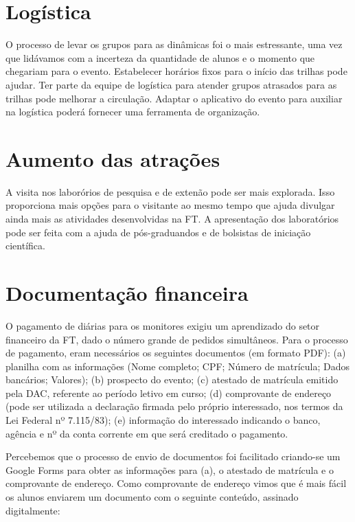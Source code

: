 \documentclass[
  letterpaper,
  DIV=11,
  numbers=noendperiod]{scrreprt}
\begin{document}
\section{Logística}\label{loguxedstica}

O processo de levar os grupos para as dinâmicas foi o mais estressante,
uma vez que lidávamos com a incerteza da quantidade de alunos e o
momento que chegariam para o evento. Estabelecer horários fixos para o
início das trilhas pode ajudar. Ter parte da equipe de logística para
atender grupos atrasados para as trilhas pode melhorar a circulação.
Adaptar o aplicativo do evento para auxiliar na logística poderá
fornecer uma ferramenta de organização.

\section{Aumento das atrações}\label{aumento-das-atrauxe7uxf5es}

A visita nos laborórios de pesquisa e de extenão pode ser mais
explorada. Isso proporciona mais opções para o visitante ao mesmo tempo
que ajuda divulgar ainda mais as atividades desenvolvidas na FT. A
apresentação dos laboratórios pode ser feita com a ajuda de
pós-graduandos e de bolsistas de iniciação científica.

\section{Documentação financeira}\label{documentauxe7uxe3o-financeira}

O pagamento de diárias para os monitores exigiu um aprendizado do setor
financeiro da FT, dado o número grande de pedidos simultâneos. Para o
processo de pagamento, eram necessários os seguintes documentos (em
formato PDF): (a) planilha com as informações (Nome completo; CPF;
Número de matrícula; Dados bancários; Valores); (b) prospecto do evento;
(c) atestado de matrícula emitido pela DAC, referente ao período letivo
em curso; (d) comprovante de endereço (pode ser utilizada a declaração
firmada pelo próprio interessado, nos termos da Lei Federal nº
7.115/83); (e) informação do interessado indicando o banco, agência e nº
da conta corrente em que será creditado o pagamento.

Percebemos que o processo de envio de documentos foi facilitado
criando-se um Google Forms para obter as informações para (a), o
atestado de matrícula e o comprovante de endereço. Como comprovante de
endereço vimos que é mais fácil os alunos enviarem um documento com o
seguinte conteúdo, assinado digitalmente:
\end{document}
